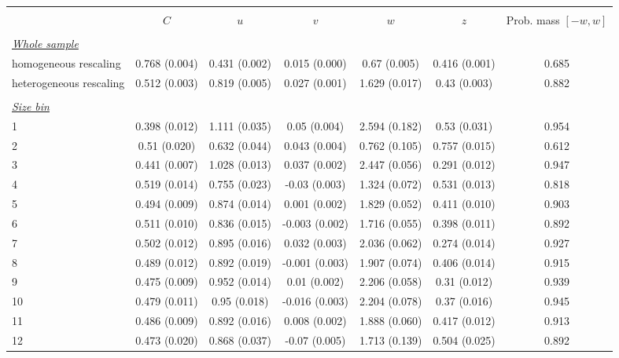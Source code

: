 
\begin{tabular}{@{\extracolsep{5pt}} l cccccc} 
\\[-1.8ex]\hline 
\hline \\[-1.8ex] 
 & $C$ & $u$ & $v$ & $w$ & $z$ & Prob. mass $[-w,w]$ \\ 
\hline \\[-1.8ex] 
\underline{{\it Whole sample}} &   &   &   &   &   &  \\ 
homogeneous rescaling & 0.768 (0.004) & 0.431 (0.002) & 0.015 (0.000) & 0.67 (0.005) & 0.416 (0.001) & 0.685 \\ 
heterogeneous rescaling & 0.512 (0.003) & 0.819 (0.005) & 0.027 (0.001) & 1.629 (0.017) & 0.43 (0.003) & 0.882 \\ 
 &   &   &   &   &   &  \\ 
\underline{{\it Size bin}} &   &   &   &   &   &  \\ 
1 & 0.398 (0.012) & 1.111 (0.035) & 0.05 (0.004) & 2.594 (0.182) & 0.53 (0.031) & 0.954 \\ 
2 & 0.51 (0.020) & 0.632 (0.044) & 0.043 (0.004) & 0.762 (0.105) & 0.757 (0.015) & 0.612 \\ 
3 & 0.441 (0.007) & 1.028 (0.013) & 0.037 (0.002) & 2.447 (0.056) & 0.291 (0.012) & 0.947 \\ 
4 & 0.519 (0.014) & 0.755 (0.023) & -0.03 (0.003) & 1.324 (0.072) & 0.531 (0.013) & 0.818 \\ 
5 & 0.494 (0.009) & 0.874 (0.014) & 0.001 (0.002) & 1.829 (0.052) & 0.411 (0.010) & 0.903 \\ 
6 & 0.511 (0.010) & 0.836 (0.015) & -0.003 (0.002) & 1.716 (0.055) & 0.398 (0.011) & 0.892 \\ 
7 & 0.502 (0.012) & 0.895 (0.016) & 0.032 (0.003) & 2.036 (0.062) & 0.274 (0.014) & 0.927 \\ 
8 & 0.489 (0.012) & 0.892 (0.019) & -0.001 (0.003) & 1.907 (0.074) & 0.406 (0.014) & 0.915 \\ 
9 & 0.475 (0.009) & 0.952 (0.014) & 0.01 (0.002) & 2.206 (0.058) & 0.31 (0.012) & 0.939 \\ 
10 & 0.479 (0.011) & 0.95 (0.018) & -0.016 (0.003) & 2.204 (0.078) & 0.37 (0.016) & 0.945 \\ 
11 & 0.486 (0.009) & 0.892 (0.016) & 0.008 (0.002) & 1.888 (0.060) & 0.417 (0.012) & 0.913 \\ 
12 & 0.473 (0.020) & 0.868 (0.037) & -0.07 (0.005) & 1.713 (0.139) & 0.504 (0.025) & 0.892 \\ 

\end{tabular}
